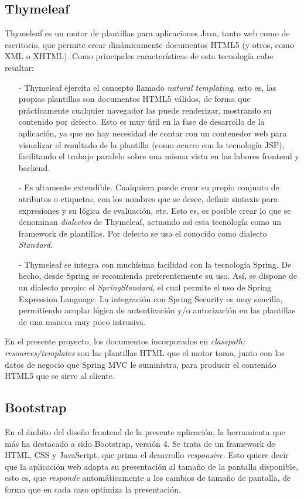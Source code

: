 \documentclass[a4paper,12pt,twoside,openright]{report}
\begin{document}
    \subsection{Thymeleaf} \label{sec:thymeleaf}
    Thymeleaf es un motor de plantillas para aplicaciones Java, tanto web como de escritorio, que permite crear dinámicamente documentos HTML5 (y otros, como XML o XHTML). Como principales características de esta tecnología cabe resaltar:
    
    \begin{itemize}
    	\item[-] Thymeleaf ejercita el concepto llamado \emph{natural templating}, esto es, las propias plantillas son documentos HTML5 válidos, de forma que prácticamente cualquier navegador las puede renderizar, mostrando su contenido por defecto. Esto es muy útil en la fase de desarrollo de la aplicación, ya que no hay necesidad de contar con un contenedor web para visualizar el resultado de la plantilla (como ocurre con la tecnología JSP), facilitando el trabajo paralelo sobre una misma vista en las labores frontend y backend.
    	\item[-] Es altamente extendible. Cualquiera puede crear su propio conjunto de atributos o etiquetas, con los nombres que se desee, definir sintaxis para expresiones y su lógica de evaluación, etc. Esto es, es posible crear lo que se denominan \emph{dialectos} de Thymeleaf, actuando así esta tecnología como un framework de plantillas. Por defecto se usa el conocido como dialecto \emph{Standard}.
    	\item[-] Thymeleaf se integra con muchísima facilidad con la tecnología Spring. De hecho, desde Spring se recomienda preferentemente su uso. Así, se dispone de un dialecto propio: el \emph{SpringStandard}, el cual permite el uso de Spring Expression Language. La integración con Spring Security es muy sencilla, permitiendo acoplar lógica de autenticación y/o autorización en las plantillas de una manera muy poco intrusiva.
    \end{itemize}
    
    En el presente proyecto, los documentos incorporados en \emph{classpath: resources/templates} son las plantillas HTML que el motor toma, junto con los datos de negocio que Spring MVC le suministra, para producir el contenido HTML5 que se sirve al cliente.
    
    \subsection{Bootstrap}
    En el ámbito del diseño frontend de la presente aplicación, la herramienta que más ha destacado a sido Bootstrap, versión 4. Se trata de un framework de HTML, CSS y JavaScript, que prima el desarrollo \emph{responsive}. Esto quiere decir que la aplicación web adapta su presentación al tamaño de la pantalla disponible, esto es, que \emph{responde} automáticamente a los cambios de tamaño de pantalla, de forma que en cada caso optimiza la presentación.
    
\end{document}
